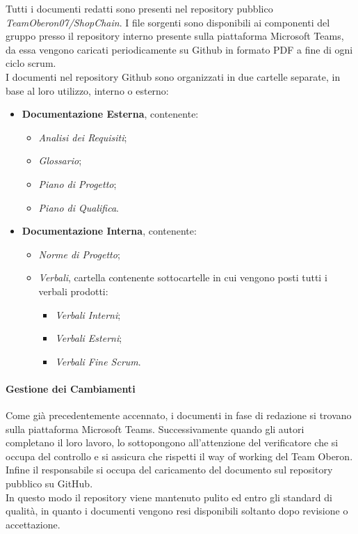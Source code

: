 Tutti i documenti redatti sono presenti nel repository pubblico \textit{TeamOberon07/ShopChain}.
I file sorgenti sono disponibili ai componenti del gruppo presso il repository interno presente sulla piattaforma Microsoft Teams, da essa vengono caricati periodicamente su Github in formato PDF a fine di ogni ciclo scrum. \\
I documenti nel repository Github sono organizzati in due cartelle separate, in base al loro utilizzo, interno o esterno:

\begin{itemize}
    \item \textbf{Documentazione Esterna}, contenente:
        \begin{itemize}
            \item \textit{Analisi dei Requisiti};
            \item \textit{Glossario};
            \item \textit{Piano di Progetto};
            \item \textit{Piano di Qualifica}.
        \end{itemize}
    \item \textbf{Documentazione Interna}, contenente: 
        \begin{itemize}
            \item \textit{Norme di Progetto};
            \item \textit{Verbali}, cartella contenente sottocartelle in cui vengono posti tutti i verbali prodotti:
                \begin{itemize}
                    \item \textit{Verbali Interni};
                    \item \textit{Verbali Esterni};
                    \item \textit{Verbali Fine Scrum}.
                \end{itemize}
        \end{itemize}
\end{itemize}

\paragraph{Gestione dei Cambiamenti}
Come già precedentemente accennato, i documenti in fase di redazione si trovano sulla piattaforma Microsoft Teams. Successivamente quando gli autori completano il loro lavoro, lo sottopongono all’attenzione del verificatore che si occupa del controllo e si assicura che rispetti il way of working del Team Oberon. Infine il responsabile si occupa del caricamento del documento sul repository pubblico su GitHub. \\
In questo modo il repository viene mantenuto pulito ed entro gli standard di qualità, in quanto i documenti vengono resi disponibili soltanto dopo revisione o accettazione.


